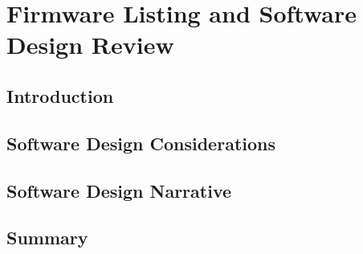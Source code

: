 \chapter{Firmware Listing and Software Design Review}

\section{Introduction}

\section{Software Design Considerations}

\section{Software Design Narrative}

\section{Summary}
